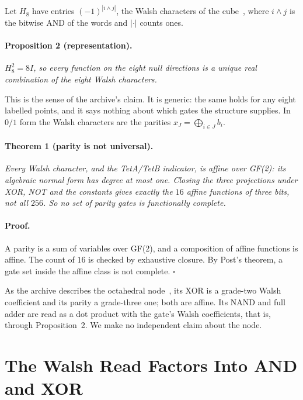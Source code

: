 \documentclass[twocolumn]{iopjournal}
\begin{document}
Let $H_8$ have entries $(-1)^{|i \wedge j|}$, the Walsh characters of
the cube~\cite{Walsh1923,Sylvester1867,ODonnell2014}, where $i \wedge j$
is the bitwise AND of the words and $|\cdot|$ counts ones.

\paragraph{Proposition 2 (representation).} \textit{$H_8^2 = 8I$, so
every function on the eight null directions is a unique real
combination of the eight Walsh characters.}

\medskip
\noindent
This is the sense of the archive's claim. It is generic: the same
holds for any eight labelled points, and it says nothing about which
gates the structure supplies. In $0/1$ form the Walsh characters are
the parities $x_J = \bigoplus_{i\in J} b_i$.

\paragraph{Theorem 1 (parity is not universal).} \textit{Every Walsh
character, and the TetA/TetB indicator, is affine over GF(2): its
algebraic normal form has degree at most one. Closing the three
projections under XOR, NOT and the constants gives exactly the $16$
affine functions of three bits, not all $256$. So no set of parity
gates is functionally complete.}

\paragraph{Proof.} A parity is a sum of variables over GF(2), and a
composition of affine functions is affine. The count of $16$ is
checked by exhaustive closure. By Post's theorem, a gate set inside the
affine class is not complete. \hfill $\square$

\medskip
\noindent
As the archive describes the octahedral node~\cite{NelsonPixel}, its
XOR is a grade-two Walsh coefficient and its parity a grade-three one;
both are affine. Its NAND and full adder are read as a dot product with
the gate's Walsh coefficients, that is, through Proposition~2. We make
no independent claim about the node.


\section{The Walsh Read Factors Into AND and XOR}
\end{document}
